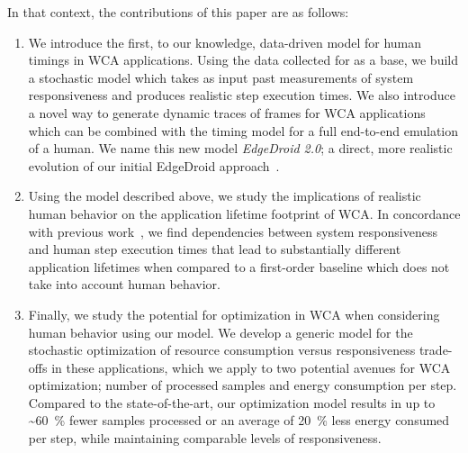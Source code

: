 In that context, the contributions of this paper are as follows:
\begin{enumerate}
    \item\label{item:contrib:model} We introduce the first, to our knowledge, data-driven model for human timings in \ac{WCA} applications.
    Using the data collected for \textcite{olguinmunoz:impact2021} as a base, we build a stochastic model which takes as input past measurements of system responsiveness and produces realistic step execution times.
    We also introduce a novel way to generate dynamic traces of frames for \ac{WCA} applications which can be combined with the timing model for a full end-to-end emulation of a human.
    We name this new model \emph{EdgeDroid 2.0}; a direct, more realistic evolution of our initial EdgeDroid approach~\cite{olguin2018scaling,olguin2019edgedroid}.
    \item\label{item:contrib:footprint} Using the model described above, we study the implications of realistic human behavior on the application lifetime footprint of \ac{WCA}.
    In concordance with previous work~\cite{olguinmunoz:impact2021}, we find dependencies between system responsiveness and human step execution times that lead to substantially different application lifetimes when compared to a first-order baseline which does not take into account human behavior.
    \item\label{item:contrib:optimization} Finally, we study the potential for optimization in \ac{WCA} when considering human behavior using our model.
    We develop a generic model for the stochastic optimization of resource consumption versus responsiveness trade-offs in these applications, which we apply to two potential avenues for \ac{WCA} optimization; number of processed samples and energy consumption per step.
    Compared to the state-of-the-art, our optimization model results in up to \textasciitilde\SI{60}{\percent} fewer samples processed or an average of \SI{20}{\percent} less energy consumed per step, while maintaining comparable levels of responsiveness.
\end{enumerate}

\medskip

